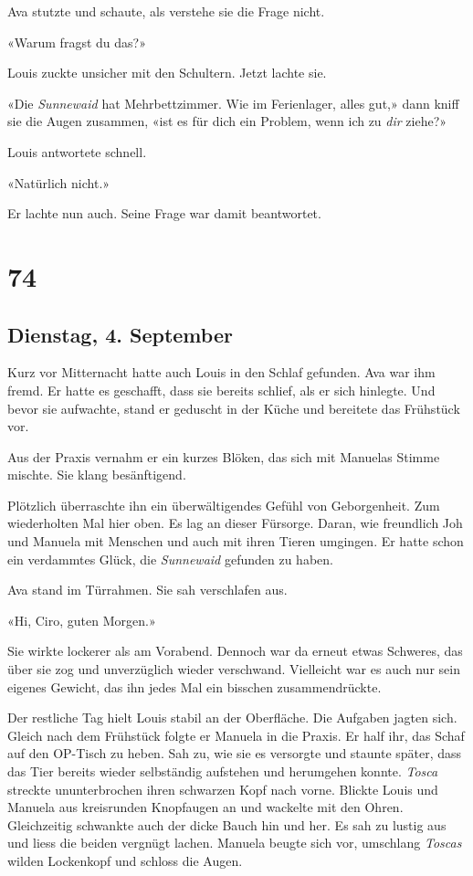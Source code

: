 Ava stutzte und schaute, als verstehe sie die Frage nicht.

«Warum fragst du das?»

Louis zuckte unsicher mit den Schultern. Jetzt lachte sie.

«Die \emph{Sunnewaid} hat Mehrbettzimmer. Wie im Ferienlager, alles
gut,» dann kniff sie die Augen zusammen, «ist es für dich ein Problem,
wenn ich zu \emph{dir} ziehe?»

Louis antwortete schnell.

«Natürlich nicht.»

Er lachte nun auch. Seine Frage war damit beantwortet.

\chapter{74}\label{section-74}

\section{Dienstag, 4. September}\label{dienstag-4.-september}

Kurz vor Mitternacht hatte auch Louis in den Schlaf gefunden. Ava war
ihm fremd. Er hatte es geschafft, dass sie bereits schlief, als er sich
hinlegte. Und bevor sie aufwachte, stand er geduscht in der Küche und
bereitete das Frühstück vor.

Aus der Praxis vernahm er ein kurzes Blöken, das sich mit Manuelas
Stimme mischte. Sie klang besänftigend.

Plötzlich überraschte ihn ein überwältigendes Gefühl von Geborgenheit.
Zum wiederholten Mal hier oben. Es lag an dieser Fürsorge. Daran, wie
freundlich Joh und Manuela mit Menschen und auch mit ihren Tieren
umgingen. Er hatte schon ein verdammtes Glück, die \emph{Sunnewaid}
gefunden zu haben.

Ava stand im Türrahmen. Sie sah verschlafen aus.

«Hi, Ciro, guten Morgen.»

Sie wirkte lockerer als am Vorabend. Dennoch war da erneut etwas
Schweres, das über sie zog und unverzüglich wieder verschwand.
Vielleicht war es auch nur sein eigenes Gewicht, das ihn jedes Mal ein
bisschen zusammendrückte.

Der restliche Tag hielt Louis stabil an der Oberfläche. Die Aufgaben
jagten sich. Gleich nach dem Frühstück folgte er Manuela in die Praxis.
Er half ihr, das Schaf auf den OP-Tisch zu heben. Sah zu, wie sie es
versorgte und staunte später, dass das Tier bereits wieder selbständig
aufstehen und herumgehen konnte. \emph{Tosca} streckte ununterbrochen
ihren schwarzen Kopf nach vorne. Blickte Louis und Manuela aus
kreisrunden Knopfaugen an und wackelte mit den Ohren. Gleichzeitig
schwankte auch der dicke Bauch hin und her. Es sah zu lustig aus und
liess die beiden vergnügt lachen. Manuela beugte sich vor, umschlang
\emph{Toscas} wilden Lockenkopf und schloss die Augen.

